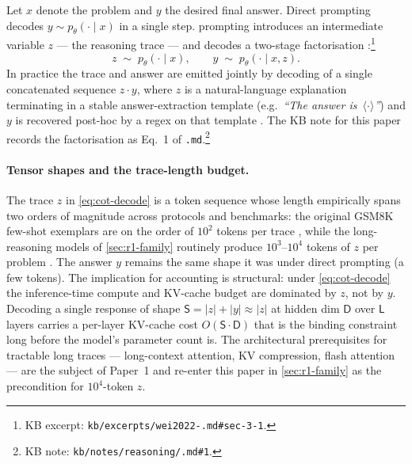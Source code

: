 Let $x$ denote the problem and $y$ the desired final answer. Direct
prompting decodes $y \sim p_\theta(\cdot \mid x)$ in a single step. 
prompting introduces an intermediate variable $z$ — the reasoning trace
— and decodes a two-stage factorisation
\citep[\S 3.1]{wei2022-cot}:\footnote{KB excerpt:
\texttt{kb/excerpts/wei2022-.md\#sec-3-1}.}
\begin{equation}
  z \;\sim\; p_\theta(\cdot \mid x), \qquad y \;\sim\; p_\theta(\cdot \mid x, z).
  \label{eq:cot-decode}
\end{equation}
In practice the trace and answer are emitted jointly by 
decoding of a single concatenated sequence $z \cdot y$, where $z$ is a
natural-language explanation terminating in a stable answer-extraction
template (e.g.\ \emph{``The answer is~$\langle\cdot\rangle$''}) and $y$
is recovered post-hoc by a regex on that template
\citep[\S 3.1]{wei2022-cot}. The KB note for this paper records the
factorisation as Eq.~1 of \texttt{.md}.\footnote{KB
note: \texttt{kb/notes/reasoning/.md\#1}.}

\paragraph{Tensor shapes and the trace-length budget.} The trace $z$ in
\cref{eq:cot-decode} is a token sequence whose length empirically spans
two orders of magnitude across protocols and benchmarks: the original
GSM8K few-shot  exemplars are on the order of $10^2$ tokens per
trace \citep[\S 3.1]{wei2022-cot}, while the long- reasoning models
of \cref{sec:r1-family} routinely produce $10^3$--$10^4$ tokens of $z$
per problem \citep[\S 2.3]{deepseek-r1}. The answer $y$ remains the
same shape it was under direct prompting (a few tokens). The
implication for accounting is structural: under \cref{eq:cot-decode}
the inference-time compute and KV-cache budget are dominated by $z$,
not by $y$. Decoding a single  response of shape
$\mathsf{S} = |z| + |y| \approx |z|$ at hidden dim $\mathsf{D}$ over
$\mathsf{L}$ layers carries a per-layer KV-cache cost
$O(\mathsf{S} \cdot \mathsf{D})$ that is the binding constraint long
before the model's parameter count is. The architectural prerequisites
for tractable long traces — long-context attention, KV compression,
flash attention — are the subject of Paper~1 and re-enter this paper
in \cref{sec:r1-family} as the precondition for $10^4$-token $z$.

